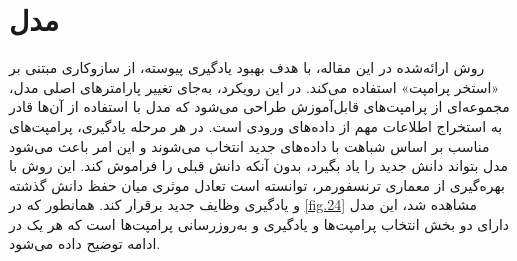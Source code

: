 \section{مدل }
روش ارائه‌شده در این مقاله، با هدف بهبود یادگیری پیوسته، از سازوکاری مبتنی بر «استخر پرامپت‌» استفاده می‌کند. در این رویکرد، به‌جای تغییر پارامتر‌های اصلی مدل، مجموعه‌ای از پرامپت‌های قابل‌آموزش طراحی می‌شود که مدل با استفاده از آن‌ها قادر به استخراج اطلاعات مهم از داده‌های ورودی است. در هر مرحله یادگیری، پرامپت‌های مناسب بر اساس شباهت با داده‌های جدید انتخاب می‌شوند و این امر باعث می‌شود مدل بتواند دانش جدید را یاد بگیرد، بدون آنکه دانش قبلی را فراموش کند. این روش با بهره‌گیری از معماری ترنسفورمر، توانسته است تعادل موثری میان حفظ دانش گذشته و یادگیری وظایف جدید برقرار کند. همانطور که در \cref{fig.24} مشاهده شد، این مدل دارای دو بخش انتخاب پرامپت‌ها و یادگیری و به‌روزرسانی پرامپت‌ها است که هر یک در ادامه توضیح داده‌ می‌شود.
‌

